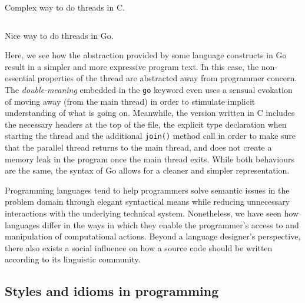 \begin{listing}
  \inputminted{python}{./corpus/thread.c}
  \caption{Complex way to do threads in C.}
  \label{code:threading-c}
\end{listing}

\begin{listing}
  \inputminted{python}{./corpus/thread.go}
  \caption{Nice way to do threads in Go.}
  \label{code:threading-go}
\end{listing}

Here, we see how the abstraction provided by some language constructs in Go result in a simpler and more expressive program text. In this case, the non-essential properties of the thread are abstracted away from programmer concern. The \emph{double-meaning} embedded in the \lstinline{go} keyword even uses a sensual evokation of moving away (from the main thread) in order to stimulate implicit understanding of what is going on. Meanwhile, the version written in C includes the necessary headers at the top of the file, the explicit type declaration when starting the thread and the additional \lstinline{join()} method call in order to make sure that the parallel thread returns to the main thread, and does not create a memory leak in the program once the main thread exits. While both behaviours are the same, the syntax of Go allows for a cleaner and simpler representation.

Programming languages tend to help programmers solve semantic issues in the problem domain through elegant syntactical means while reducing unnecessary interactions with the underlying technical system. Nonetheless, we have seen how languages differ in the ways in which they enable the programmer's access to and manipulation of computational actions. Beyond a language designer's perspective, there also exists a social influence on how a source code should be written according to its linguistic community.

\subsection{Styles and idioms in programming}
\label{subsec:style-idioms-programming}

